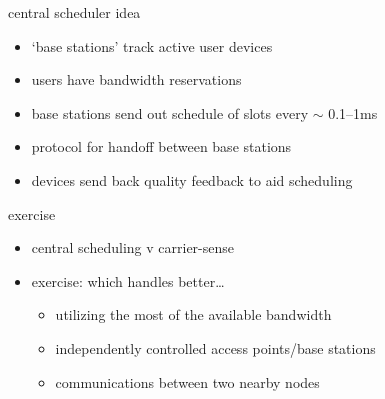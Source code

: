 \begin{frame}{central scheduler idea}
    \begin{itemize}
    \item `base stations' track active user devices
    \item users have bandwidth reservations
    \vspace{.5cm}
    \item base stations send out schedule of slots every $\sim$ 0.1--1ms
    \item protocol for handoff between base stations
    \item devices send back quality feedback to aid scheduling
    \end{itemize}
\end{frame}

\begin{frame}{exercise}
    \begin{itemize}
    \item central scheduling v carrier-sense
    \vspace{.5cm}
    \item exercise: which handles better\ldots
        \begin{itemize}
        \item utilizing the most of the available bandwidth
        \item independently controlled access points/base stations
        \item communications between two nearby nodes
        \end{itemize}
    \end{itemize}
\end{frame}

